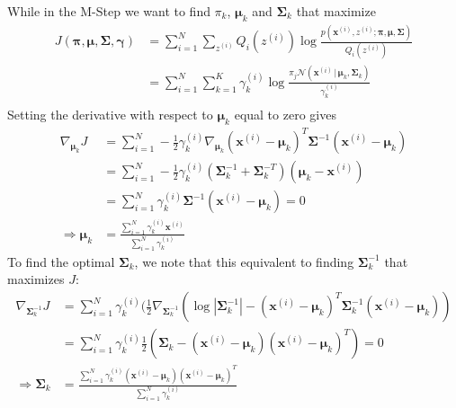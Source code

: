 \documentclass[final,3p,times,twocolumn]{elsarticle}
\begin{document}
While in the M-Step we want to find $\pi_k$, $\boldsymbol \mu_k$ and $\boldsymbol \Sigma_k$ that maximize
\begin{equation}
\label{eqn:gmmM1}
\begin{split}
J(\boldsymbol \pi, \boldsymbol \mu, \boldsymbol \Sigma, \boldsymbol \gamma) &= \sum_{i=1}^N\sum_{z^{(i)}} Q_i(z^{(i)}) \log \frac{p(\boldsymbol x^{(i)},z^{(i)};\boldsymbol \pi, \boldsymbol \mu, \boldsymbol \Sigma)}{Q_i(z^{(i)})}\\
&= \sum_{i=1}^N \sum_{k=1}^K \gamma_k^{(i)} \log \frac{\pi_j \mathcal{N}(\boldsymbol x^{(i)} \,|\, \boldsymbol \mu_k, \boldsymbol \Sigma_k)}{\gamma_k^{(i)}}\\
\end{split}
\end{equation}
Setting the derivative with respect to $\boldsymbol \mu_k$ equal to zero gives
\begin{equation}
\begin{split}
\label{eqn:gmmMu}
\nabla_{\boldsymbol \mu_k} J &= \sum_{i=1}^N -\frac{1}{2}\gamma_k^{(i)} \nabla_{\boldsymbol \mu_k} (\boldsymbol x^{(i)} - \boldsymbol \mu_k)^T \boldsymbol \Sigma^{-1}(\boldsymbol x^{(i)} - \boldsymbol \mu_k)\\
&= \sum_{i=1}^N -\frac{1}{2}\gamma_k^{(i)}(\boldsymbol \Sigma_k^{-1} + \boldsymbol \Sigma_k^{-T})(\boldsymbol \mu_k - \boldsymbol x^{(i)})\\
&= \sum_{i=1}^N\gamma_k^{(i)} \boldsymbol \Sigma^{-1} (\boldsymbol x^{(i)} - \boldsymbol \mu_k) = 0\\
\Rightarrow \boldsymbol \mu_k &= \frac{\sum_{i=1}^N\gamma_k^{(i)} \boldsymbol x^{(i)}}{\sum_{i=1}^N \gamma_k^{(i)}}
\end{split}
\end{equation}
To find the optimal $\boldsymbol \Sigma_k$, we note that this equivalent to finding $\boldsymbol \Sigma_k^{-1}$ that maximizes $J$:
\begin{equation}
\label{eqn:gmmSigma}
\begin{split}
\nabla_{\boldsymbol \Sigma_k^{-1}} J &= \sum_{i=1}^N \gamma_k^{(i)}(\frac{1}{2}\nabla_{\boldsymbol \Sigma_k^{-1}}(\log |\boldsymbol \Sigma_k^{-1}| - (\boldsymbol x^{(i)} - \boldsymbol \mu_k)^T \boldsymbol \Sigma_k^{-1}(\boldsymbol x^{(i)} - \boldsymbol \mu_k))\\
&= \sum_{i=1}^N \gamma_k^{(i)} \frac{1}{2}(\boldsymbol \Sigma_k - (\boldsymbol x^{(i)} - \boldsymbol \mu_k)(\boldsymbol x^{(i)} - \boldsymbol \mu_k)^T) = 0\\
\Rightarrow \boldsymbol \Sigma_k &= \frac{\sum_{i=1}^N \gamma_k^{(i)}(\boldsymbol x^{(i)} - \boldsymbol \mu_k)(\boldsymbol x^{(i)} - \boldsymbol \mu_k)^T}{\sum_{i=1}^N \gamma_k^{(i)}}
\end{split}
\end{equation}
\end{document}
